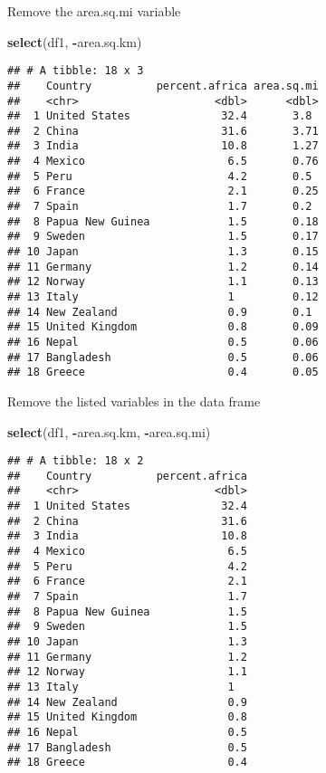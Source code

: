 \documentclass[
]{article}
\newenvironment{Shaded}{\begin{snugshade}}{\end{snugshade}}
\newcommand{\FunctionTok}[1]{\textcolor[rgb]{0.13,0.29,0.53}{\textbf{#1}}}
\newcommand{\NormalTok}[1]{#1}
\newcommand{\SpecialCharTok}[1]{\textcolor[rgb]{0.81,0.36,0.00}{\textbf{#1}}}
\begin{document}
Remove the area.sq.mi variable

\begin{Shaded}
\begin{Highlighting}[]
\FunctionTok{select}\NormalTok{(df1, }\SpecialCharTok{{-}}\NormalTok{area.sq.km)}
\end{Highlighting}
\end{Shaded}

\begin{verbatim}
## # A tibble: 18 x 3
##    Country          percent.africa area.sq.mi
##    <chr>                     <dbl>      <dbl>
##  1 United States              32.4       3.8 
##  2 China                      31.6       3.71
##  3 India                      10.8       1.27
##  4 Mexico                      6.5       0.76
##  5 Peru                        4.2       0.5 
##  6 France                      2.1       0.25
##  7 Spain                       1.7       0.2 
##  8 Papua New Guinea            1.5       0.18
##  9 Sweden                      1.5       0.17
## 10 Japan                       1.3       0.15
## 11 Germany                     1.2       0.14
## 12 Norway                      1.1       0.13
## 13 Italy                       1         0.12
## 14 New Zealand                 0.9       0.1 
## 15 United Kingdom              0.8       0.09
## 16 Nepal                       0.5       0.06
## 17 Bangladesh                  0.5       0.06
## 18 Greece                      0.4       0.05
\end{verbatim}

Remove the listed variables in the data frame

\begin{Shaded}
\begin{Highlighting}[]
\FunctionTok{select}\NormalTok{(df1, }\SpecialCharTok{{-}}\NormalTok{area.sq.km, }\SpecialCharTok{{-}}\NormalTok{area.sq.mi) }
\end{Highlighting}
\end{Shaded}

\begin{verbatim}
## # A tibble: 18 x 2
##    Country          percent.africa
##    <chr>                     <dbl>
##  1 United States              32.4
##  2 China                      31.6
##  3 India                      10.8
##  4 Mexico                      6.5
##  5 Peru                        4.2
##  6 France                      2.1
##  7 Spain                       1.7
##  8 Papua New Guinea            1.5
##  9 Sweden                      1.5
## 10 Japan                       1.3
## 11 Germany                     1.2
## 12 Norway                      1.1
## 13 Italy                       1  
## 14 New Zealand                 0.9
## 15 United Kingdom              0.8
## 16 Nepal                       0.5
## 17 Bangladesh                  0.5
## 18 Greece                      0.4
\end{verbatim}
\end{document}
